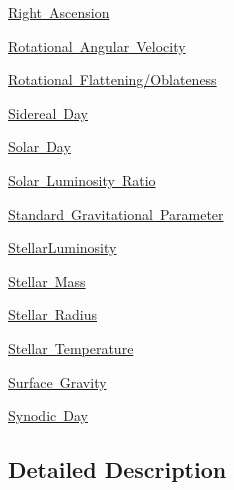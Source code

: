 \begin{DoxyCompactItemize}
\mbox{\hyperlink{group___e_g_x_phys-_astrophysics-_right_ascension}{Right Ascension}}
\item 
\mbox{\hyperlink{group___e_g_x_phys-_astrophysics-_rotational_angular_velocity}{Rotational Angular Velocity}}
\item 
\mbox{\hyperlink{group___e_g_x_phys-_astrophysics-_rotational_flattening}{Rotational Flattening/\+Oblateness}}
\item 
\mbox{\hyperlink{group___e_g_x_phys-_astrophysic-_sidereal_day}{Sidereal Day}}
\item 
\mbox{\hyperlink{group___e_g_x_phys-_astrophysic-_solar_day}{Solar Day}}
\item 
\mbox{\hyperlink{group___e_g_x_phys-_astrophysics-_solar_luminosity_ratio}{Solar Luminosity Ratio}}
\item 
\mbox{\hyperlink{group___e_g_x_phys-_astrophysics-_standard_gravitational_parameter}{Standard Gravitational Parameter}}
\item 
\mbox{\hyperlink{group___e_g_x_phys-_astrophysics-_stellar_luminosity}{Stellar\+Luminosity}}
\item 
\mbox{\hyperlink{group___e_g_x_phys-_stellar_mass}{Stellar Mass}}
\item 
\mbox{\hyperlink{group___e_g_x_phys-_stellar_radius}{Stellar Radius}}
\item 
\mbox{\hyperlink{group___e_g_x_phys-_stellar_temperature}{Stellar Temperature}}
\item 
\mbox{\hyperlink{group___e_g_x_phys-_astrophysics-_surface_gravity}{Surface Gravity}}
\item 
\mbox{\hyperlink{group___e_g_x_phys-_astrophysic-_synodic_day}{Synodic Day}}
\end{DoxyCompactItemize}


\subsection{Detailed Description}
